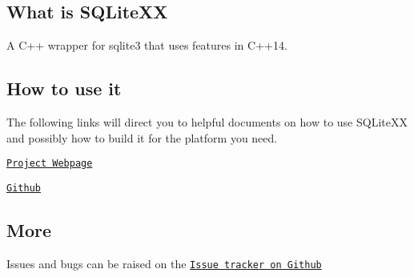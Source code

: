 \subsection*{What is S\-Q\-Lite\-X\-X}

A C++ wrapper for sqlite3 that uses features in C++14.

\subsection*{How to use it}

The following links will direct you to helpful documents on how to use S\-Q\-Lite\-X\-X and possibly how to build it for the platform you need.


\begin{DoxyItemize}
\item \href{https://maxxboehme.github.io/SQLiteXX}{\tt Project Webpage}
\item \href{https://github.com/maxxboehme/SQLiteXX}{\tt Github}
\end{DoxyItemize}

\subsection*{More}


\begin{DoxyItemize}
\item Issues and bugs can be raised on the \href{https://github.com/maxxboehme/SQLiteXX/issues}{\tt Issue tracker on Github} 
\end{DoxyItemize}